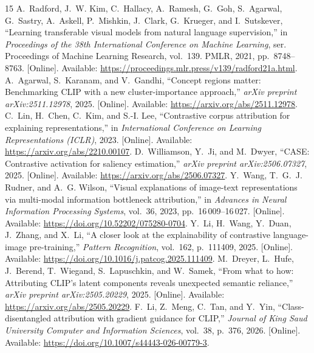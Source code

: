 \begin{thebibliography}{15}
A.~Radford, J.~W. Kim, C.~Hallacy, A.~Ramesh, G.~Goh, S.~Agarwal, G.~Sastry,
A.~Askell, P.~Mishkin, J.~Clark, G.~Krueger, and I.~Sutskever, ``Learning
transferable visual models from natural language supervision,'' in
\emph{Proceedings of the 38th International Conference on Machine Learning},
ser. Proceedings of Machine Learning Research, vol.~139. PMLR, 2021,
pp.~8748--8763. [Online]. Available:
\url{https://proceedings.mlr.press/v139/radford21a.html}.
A.~Agarwal, S.~Karanam, and V.~Gandhi, ``Concept regions matter: Benchmarking
{CLIP} with a new cluster-importance approach,'' \emph{arXiv preprint arXiv:2511.12978},
2025. [Online]. Available:
\url{https://arxiv.org/abs/2511.12978}.
C.~Lin, H.~Chen, C.~Kim, and S.-I. Lee, ``Contrastive corpus attribution for
explaining representations,'' in \emph{International Conference on Learning
Representations (ICLR)}, 2023. [Online]. Available:
\url{https://arxiv.org/abs/2210.00107}.
D.~Williamson, Y.~Ji, and M.~Dwyer, ``{CASE}: Contrastive activation for saliency
estimation,'' \emph{arXiv preprint arXiv:2506.07327}, 2025. [Online]. Available:
\url{https://arxiv.org/abs/2506.07327}.
Y.~Wang, T.~G.~J. Rudner, and A.~G. Wilson, ``Visual explanations of image-text
representations via multi-modal information bottleneck attribution,'' in
\emph{Advances in Neural Information Processing Systems}, vol.~36, 2023,
pp.~16\,009--16\,027. [Online]. Available:
\url{https://doi.org/10.52202/075280-0704}.
Y.~Li, H.~Wang, Y.~Duan, J.~Zhang, and X.~Li, ``A closer look at the explainability
of contrastive language-image pre-training,'' \emph{Pattern Recognition},
vol.~162, p.~111409, 2025. [Online]. Available:
\url{https://doi.org/10.1016/j.patcog.2025.111409}.
M.~Dreyer, L.~Hufe, J.~Berend, T.~Wiegand, S.~Lapuschkin, and W.~Samek, ``From
what to how: Attributing {CLIP}'s latent components reveals unexpected semantic
reliance,'' \emph{arXiv preprint arXiv:2505.20229}, 2025. [Online]. Available:
\url{https://arxiv.org/abs/2505.20229}.
F.~Li, Z.~Meng, C.~Tan, and Y.~Yin, ``Class-disentangled attribution with gradient
guidance for {CLIP},'' \emph{Journal of King Saud University Computer and
Information Sciences}, vol.~38, p.~376, 2026. [Online]. Available:
\url{https://doi.org/10.1007/s44443-026-00779-3}.

\end{thebibliography}
